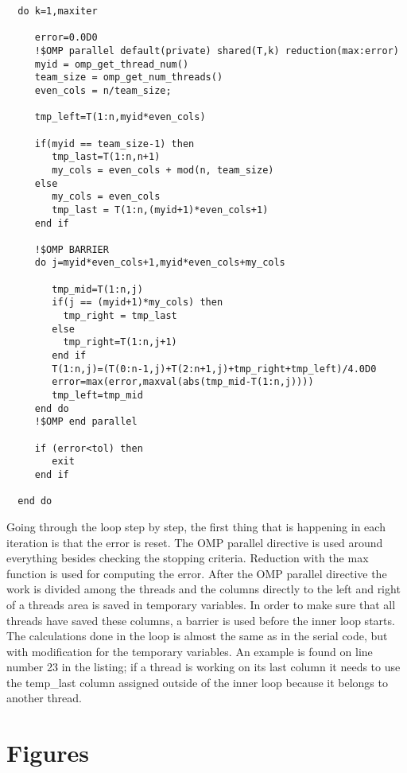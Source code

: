 \documentclass[a4paper, 12pt]{article}
\begin{document}
\begin{lstlisting}
  do k=1,maxiter
     
     error=0.0D0
     !$OMP parallel default(private) shared(T,k) reduction(max:error)
     myid = omp_get_thread_num()
     team_size = omp_get_num_threads()
     even_cols = n/team_size;

     tmp_left=T(1:n,myid*even_cols)

     if(myid == team_size-1) then
        tmp_last=T(1:n,n+1)
        my_cols = even_cols + mod(n, team_size)
     else 
        my_cols = even_cols
        tmp_last = T(1:n,(myid+1)*even_cols+1)
     end if

     !$OMP BARRIER
     do j=myid*even_cols+1,myid*even_cols+my_cols

        tmp_mid=T(1:n,j)
        if(j == (myid+1)*my_cols) then
          tmp_right = tmp_last
        else
          tmp_right=T(1:n,j+1)
        end if
        T(1:n,j)=(T(0:n-1,j)+T(2:n+1,j)+tmp_right+tmp_left)/4.0D0
        error=max(error,maxval(abs(tmp_mid-T(1:n,j))))
        tmp_left=tmp_mid
     end do
     !$OMP end parallel
     
     if (error<tol) then
        exit
     end if
     
  end do
\end{lstlisting}

Going through the loop step by step, the first thing that is happening in each
iteration is that the error is reset. The OMP parallel directive is used around
everything besides checking the stopping criteria. Reduction with the max
function is used for computing the error. After the OMP parallel directive the
work is divided among the threads and the columns directly to the left and right
of a threads area is saved in temporary variables. In order to make sure that
all threads have saved these columns, a barrier is used before the inner loop
starts. The calculations done in the loop is almost the same as in the serial
code, but with modification for the temporary variables. An example is found on
line number 23 in the listing; if a thread is working on its
last column it needs to use the temp\_last column assigned outside of the inner
loop because it belongs to another thread. 

\newpage
\appendix
\section{Figures}
\end{document}
